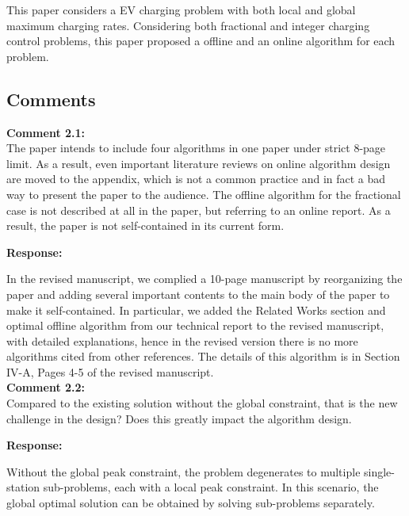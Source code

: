 \documentclass[11pt]{article}
\newcommand{\rev}[1]{{\color{black}#1}}%
\newcommand{\rev}[1]{#1}
\begin{document}
{\color{blue}This paper considers a EV charging problem with both local and global maximum charging rates. Considering both fractional and integer charging control problems, this paper proposed a offline and an online algorithm for each problem.}

\subsection{Comments}

\vspace{5mm}
{
{\color{blue}\noindent\textbf{Comment 2.1:}\\
The paper intends to include four algorithms in one paper under strict 8-page limit. As a result, even important literature reviews on online algorithm design are moved to the appendix, which is not a common practice and in fact a bad way to present the paper to the audience. The offline algorithm for the fractional case is not described at all in the paper, but referring to an online report. As a result, the paper is not self-contained in its current form.
}}

\vspace{5mm}
\noindent\textbf{Response:} 

In the revised manuscript, we complied a 10-page manuscript by reorganizing the paper and adding several important contents to the main body of the paper to make it self-contained. In particular, we added the \rev{Related Works section} and optimal offline algorithm from our technical report to the revised manuscript, with detailed explanations, hence in the revised version there is no more algorithms cited from other references. The details of this algorithm is in Section IV-A, Pages 4-5 of the revised manuscript. 
\\


\vspace{5mm}
{
{\color{blue}\noindent\textbf{Comment 2.2:}\\
Compared to the existing solution without the global constraint, that is the new challenge in the design? Does this greatly impact the algorithm design.
}}

\vspace{5mm}
\noindent\textbf{Response:}

Without the global peak constraint, the problem degenerates to multiple single-station sub-problems, each with a local peak constraint. In this scenario, the global optimal solution can be obtained by solving sub-problems separately. 
\end{document}

